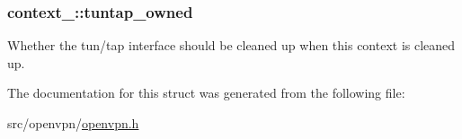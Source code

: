 \subsubsection[{tuntap\+\_\+owned}]{ context\+\_\+::tuntap\+\_\+owned}\label{structcontext__1_acae58a5af5e0f65b4963b44c6e9715e5}
Whether the tun/tap interface should be cleaned up when this context is cleaned up. 

The documentation for this struct was generated from the following file\+:\begin{DoxyCompactItemize}
\item 
src/openvpn/\hyperlink{openvpn_8h}{openvpn.\+h}\end{DoxyCompactItemize}

